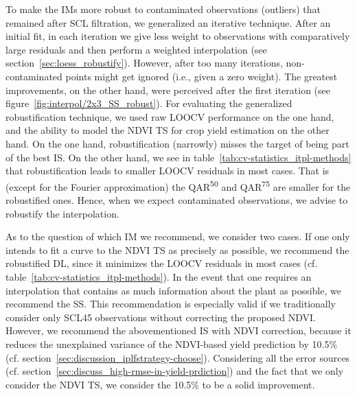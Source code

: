     To make the {{IM}}s more robust to contaminated observations (outliers) that remained after SCL filtration, we generalized an iterative technique. After an initial fit, in each iteration we give less weight to observations with comparatively large residuals and then perform a weighted interpolation (see section~\ref{sec:loess_robustify}). However, after too many iterations, non-contaminated points might get ignored (i.e., given a zero weight). The greatest improvements, on the other hand, were perceived after the first iteration (see figure~\ref{fig:interpol/2x3_SS_robust}). 
    For evaluating the generalized robustification technique, we used raw LOOCV performance on the one hand, and the ability to model the NDVI TS for crop yield estimation on the other hand.
    On the one hand, robustification (narrowly) misses the target of being part of the best {{IS}}. On the other hand, we see in table~\ref{tab:cv-statistics_itpl-methods} that robustification leads to smaller LOOCV residuals in most cases. That is (except for the Fourier approximation) the QAR\textsuperscript{50} and QAR\textsuperscript{75} are smaller for the robustified ones. Hence, when we expect contaminated observations, we advise to robustify the interpolation. 

As to the question of which {{IM}} we recommend, we consider two cases. If one only intends to fit a curve to the NDVI TS as precisely as possible, we recommend the robustified DL, since it minimizes the LOOCV residuals in most cases (cf. table~\ref{tab:cv-statistics_itpl-methods}). In the event that one requires an interpolation that contains as much information about the plant as possible, we recommend the SS. This recommendation is especially valid if we traditionally consider only SCL45 observations without correcting the proposed NDVI. However, we recommend the abovementioned {{IS}} with NDVI correction, because it reduces the unexplained variance of the NDVI-based yield prediction by 10.5\% (cf. section~\ref{sec:discussion_iplfstrategy-choose}). Considering all the error sources (cf. section~\ref{sec:discuss_high-rmse-in-yield-prdiction}) and the fact that we only consider the NDVI {TS}, we consider the 10.5\% to be a solid improvement.%




